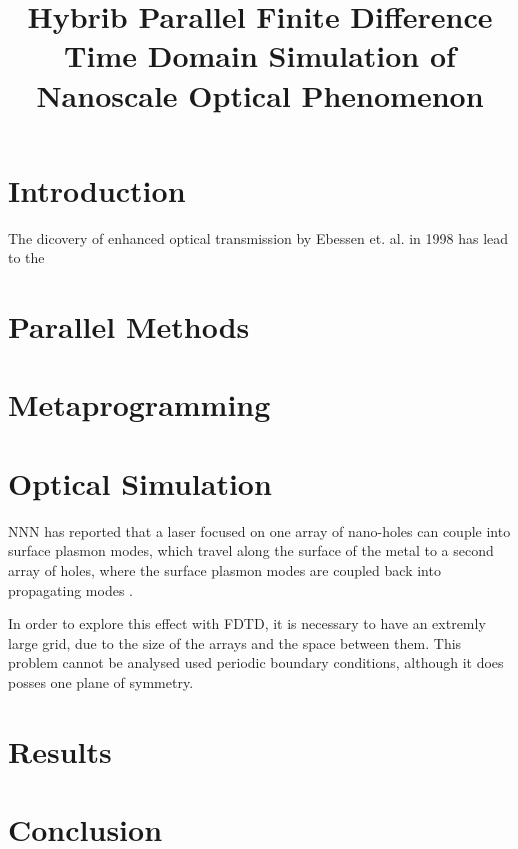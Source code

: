 \documentclass[11pt, conference, draftcls, letterpaper]{IEEEtran}
\begin{document}
\title{Hybrib Parallel Finite Difference Time Domain Simulation of
  Nanoscale Optical Phenomenon}
\author{ 
}

\maketitle

\begin{abstract}
  
\end{abstract}


\section{Introduction}
The dicovery of enhanced optical transmission by Ebessen
et. al. \cite{ebessen1998} in 1998 has lead to the 

\section{Parallel Methods}

\section{Metaprogramming}

\section{Optical Simulation}
NNN has reported that a laser focused on one array of nano-holes can
couple into surface plasmon modes, which travel along the surface of
the metal to a second array of holes, where the surface plasmon modes
are coupled back into propagating modes \cite{}. 

In order to explore this effect with FDTD, it is necessary to have
an extremly large grid, due to the size of the arrays and the space
between them. This problem cannot be analysed used periodic boundary
conditions, although it does posses one plane of symmetry. 

\section{Results}

\section{Conclusion}




\end{document}
